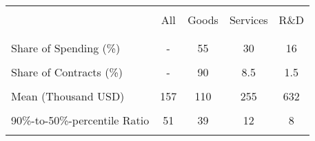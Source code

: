 \begin{tabular}{l cccc} \hline 

\vspace{-2pt} & \vspace{-2pt} & \vspace{-2pt} & \vspace{-2pt} & \vspace{-2pt} \\
& All & Goods & Services & R\&D \\
\vspace{-2pt} & \vspace{-2pt} & \vspace{-2pt} & \vspace{-2pt} & \vspace{-2pt} \\ \hline
\vspace{-0.7pt} & \vspace{-0.7pt} & \vspace{-0.7pt} & \vspace{-0.7pt} & \vspace{-0.7pt} \\ 

Share of Spending  (\%) & - & 55 & 30 & 16 \\
\vspace{-2pt} & \vspace{-2pt} & \vspace{-2pt} & \vspace{-2pt} & \vspace{-2pt} \\

Share of Contracts (\%) & - & 90 & 8.5 & 1.5 \\
\vspace{-2pt} & \vspace{-2pt} & \vspace{-2pt} & \vspace{-2pt} & \vspace{-2pt} \\

Mean (Thousand USD)     & 157 & 110 & 255 & 632 \\
\vspace{-2pt} & \vspace{-2pt} & \vspace{-2pt} & \vspace{-2pt} & \vspace{-2pt} \\

90\%-to-50\%-percentile Ratio & 51 & 39 & 12 & 8 \\
\vspace{-2pt} & \vspace{-2pt} & \vspace{-2pt} & \vspace{-2pt} & \vspace{-2pt} \\


\end{tabular}
